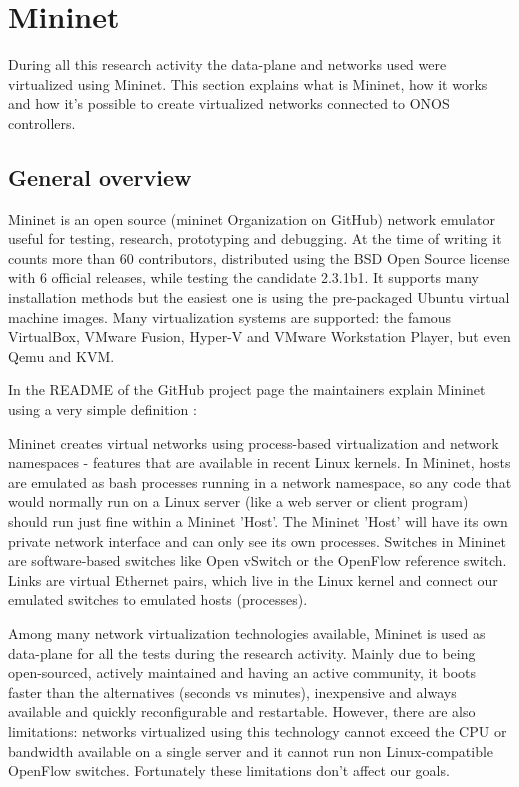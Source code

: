\documentclass[a4paper,10pt]{memoir}
\begin{document}
\clearpage

\section{Mininet}

During all this research activity the data-plane and networks used were virtualized using Mininet. This section explains what is Mininet, how it works and how it's possible to create virtualized networks connected to ONOS controllers.

\subsection{General overview}
Mininet is an open source (mininet Organization on GitHub) network emulator useful for testing, research, prototyping and debugging. At the time of writing it counts more than 60 contributors, distributed using the BSD Open Source license with 6 official releases, while testing the candidate 2.3.1b1. It supports many installation methods but the easiest one is using the pre-packaged Ubuntu virtual machine images. Many virtualization systems are supported: the famous VirtualBox, VMware Fusion, Hyper-V and VMware Workstation Player, but even Qemu and KVM.

In the README of the GitHub project page the maintainers explain Mininet using a very simple definition \cite{mininetgh}: 
\begin{quoting}[font=itshape, begintext={"}, endtext={"}]Mininet creates virtual networks using process-based virtualization and network namespaces - features that are available in recent Linux kernels. In Mininet, hosts are emulated as bash processes running in a network namespace, so any code that would normally run on a Linux server (like a web server or client program) should run just fine within a Mininet 'Host'. The Mininet 'Host' will have its own private network interface and can only see its own processes. Switches in Mininet are software-based switches like Open vSwitch or the OpenFlow reference switch. Links are virtual Ethernet pairs, which live in the Linux kernel and connect our emulated switches to emulated hosts (processes).
\end{quoting}

Among many network virtualization technologies available, Mininet is used as data-plane for all the tests during the research activity. Mainly due to being open-sourced, actively maintained and having an active community, it boots faster than the alternatives (seconds vs minutes), inexpensive and always available and quickly reconfigurable and restartable. However, there are also limitations: networks virtualized using this technology cannot exceed the CPU or bandwidth available on a single server and it cannot run non Linux-compatible OpenFlow switches. Fortunately these limitations don't affect our goals.
\end{document}
